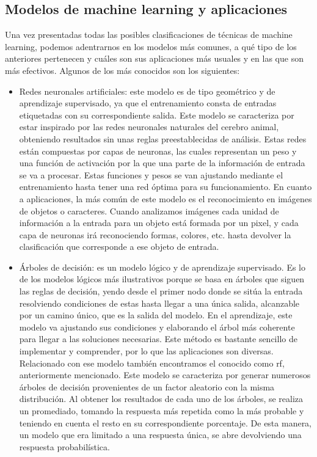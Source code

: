 \subsection{Modelos de machine learning y aplicaciones}
\par Una vez presentadas todas las posibles clasificaciones de técnicas de machine learning, podemos adentrarnos en los modelos más comunes, a qué tipo de los anteriores pertenecen y cuáles son sus aplicaciones más usuales y en las que son más efectivos. Algunos de los más conocidos son los siguientes:
\begin{itemize}
	\item Redes neuronales artificiales: este modelo es de tipo geométrico y de aprendizaje supervisado, ya que el entrenamiento consta de entradas etiquetadas con su correspondiente salida. Este modelo se caracteriza por estar inspirado por las redes neuronales naturales del cerebro animal, obteniendo resultados sin unas reglas preestablecidas de análisis. Estas redes están compuestas por capas de neuronas, las cuales representan un peso y una función de activación por la que una parte de la información de entrada se va a procesar. Estas funciones y pesos se van ajustando mediante el entrenamiento hasta tener una red óptima para su funcionamiento. En cuanto a aplicaciones, la más común de este modelo es el reconocimiento en imágenes de objetos o caracteres. Cuando analizamos imágenes cada unidad de información a la entrada para un objeto está formada por un pixel, y cada capa de neuronas irá reconociendo formas, colores, etc. hasta devolver la clasificación que corresponde a ese objeto de entrada. 
	\item Árboles de decisión: es un modelo lógico y de aprendizaje supervisado. Es lo de los modelos lógicos más ilustrativos porque se basa en árboles que siguen las reglas de decisión, yendo desde el primer nodo donde se sitúa la entrada resolviendo condiciones de estas hasta llegar a una única salida, alcanzable por un camino único, que es la salida del modelo. En el aprendizaje, este modelo va ajustando sus condiciones y elaborando el árbol más coherente para llegar a las soluciones necesarias. Este método es bastante sencillo de implementar y comprender, por lo que las aplicaciones son diversas. Relacionado con ese modelo también encontramos el conocido como \gls{rf}, anteriormente mencionado. Este modelo se caracteriza por generar numerosos árboles de decisión provenientes de un factor aleatorio con la misma distribución. Al obtener los resultados de cada uno de los árboles, se realiza un promediado, tomando la respuesta más repetida como la más probable y teniendo en cuenta el resto en su correspondiente porcentaje. De esta manera, un modelo que era limitado a una respuesta única, se abre devolviendo una respuesta probabilística. 

\end{itemize}
